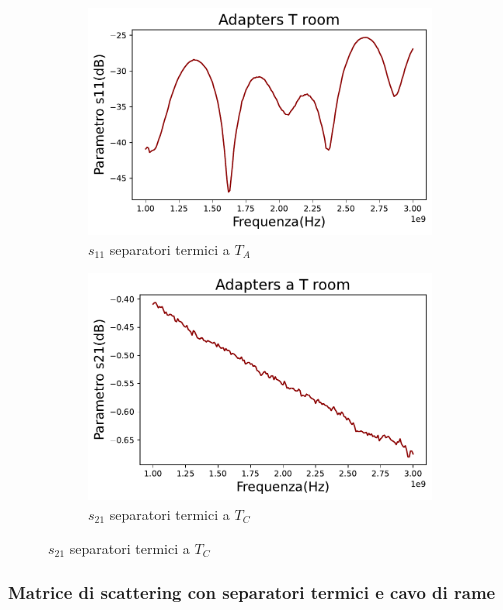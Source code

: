 \begin{figure}[h]
\centering

\begin{subfigure}{0.49\textwidth}
	\includegraphics[width=\textwidth]{S11_TA.pdf}
    \caption{$s_{11}$ separatori termici a $T_{A}$}
    \label{fig:sub1}
\end{subfigure}
\hfill
\begin{subfigure}{0.49\textwidth}
    \includegraphics[width=\textwidth]{S21_TA.pdf}
    \caption{$s_{21}$ separatori termici a $T_{C}$}
    \label{fig:sub2}
\end{subfigure}

\end{figure}

\subsubsection{Matrice di scattering con separatori termici e cavo di rame}

